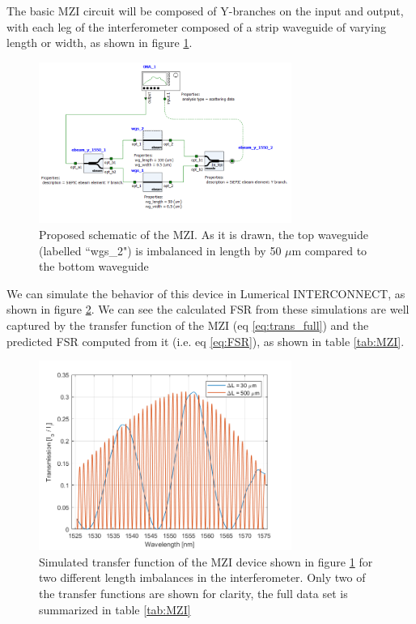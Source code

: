 \documentclass[journal]{IEEEtran}
\begin{document}
The basic MZI circuit will be composed of Y-branches on the input and output, with each leg of the interferometer composed of a strip waveguide of varying length or width, as shown in figure \ref{fig:schematic}.


\begin{figure}[t!]
  \centering
  \includegraphics[width = 3.25in]{fig/MZI_schematic.png}
  \caption{Proposed schematic of the MZI. As it is drawn, the top waveguide (labelled ``wgs\_2") is imbalanced in length by 50 $\mu$m compared to the bottom waveguide}
  \label{fig:schematic}
\end{figure}

We can simulate the behavior of this device in Lumerical INTERCONNECT, as shown in figure \ref{fig:deltaL}. We can see the calculated FSR from these simulations are well captured by the transfer function of the MZI (eq \ref{eq:trans_full}) and the predicted FSR computed from it (i.e. eq \ref{eq:FSR}), as shown in table \ref{tab:MZI}.

\begin{figure}[t!]
  \centering
  \includegraphics[width = 3.25in]{fig/MZI_length_variation.png}
  \caption{Simulated transfer function of the MZI device shown in figure \ref{fig:schematic} for two different length imbalances in the interferometer. Only two of the transfer functions are shown for clarity, the full data set is summarized in table \ref{tab:MZI}}
  \label{fig:deltaL}
\end{figure}
\end{document}
